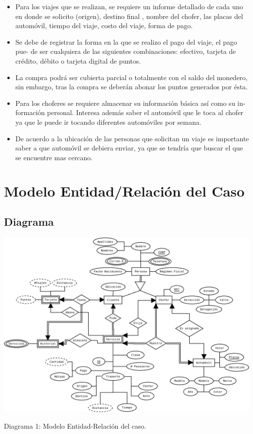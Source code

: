 \documentclass{article}
\begin{document}
{\begin{itemize}
           \item Para los viajes que se realizan, se requiere un informe detallado de cada uno
             en donde se solicito (origen), destino final , nombre del chofer, las placas del
             automóvil, tiempo del viaje, costo del viaje, forma de pago.

           \item Se debe de registrar la forma en la que se realizo el pago del viaje, el pago pue-
             de ser cualquiera de las siguientes combinaciones: efectivo, tarjeta de crédito,
             débito o tarjeta digital de puntos.

           \item La compra podrá ser cubierta parcial o totalmente con el saldo del monedero, sin
             embargo, tras la compra se deberán abonar los puntos generados por ésta.

           \item Para los choferes se requiere almacenar su información básica así como su in-
             formación personal. Interesa además saber el automóvil que le toca al chofer ya
             que le puede ir tocando diferentes automóviles por semana.

           \item De acuerdo a la ubicación de las personas que solicitan un viaje es importante
             saber a que automóvil se debiera enviar, ya que se tendría que buscar el que se
             encuentre mas cercano.
       \end{itemize}}
       
       \section{Modelo Entidad/Relación del Caso}

       \subsection{Diagrama}

       \includegraphics[width=15cm]{ER.png}\\
       \centerline{Diagrama 1: Modelo Entidad-Relación del caso.}\\
\end{document}
